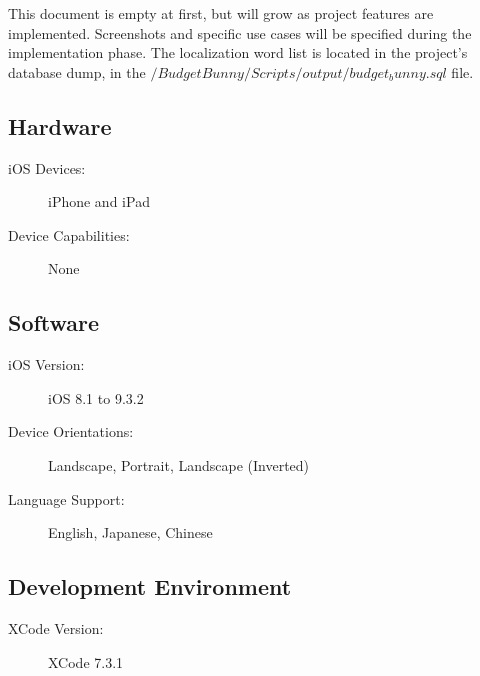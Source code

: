 
This document is empty at first, but will grow as project features are implemented.  
Screenshots and specific use cases will be specified during the implementation phase.
The localization word list is located in the project's database dump, in the $/BudgetBunny/Scripts/output/budget_bunny.sql$ file.

\subsection{Hardware}
\begin{description}
\item[iOS Devices:] iPhone and iPad
\item[Device Capabilities:] None
\end{description}

\subsection{Software}
\begin{description}
\item[iOS Version:] iOS 8.1 to 9.3.2
\item[Device Orientations:] Landscape, Portrait, Landscape (Inverted)
\item[Language Support:] English, Japanese, Chinese
\end{description}

\subsection{Development Environment}
\begin{description}
\item[XCode Version:] XCode 7.3.1
\end{description}

